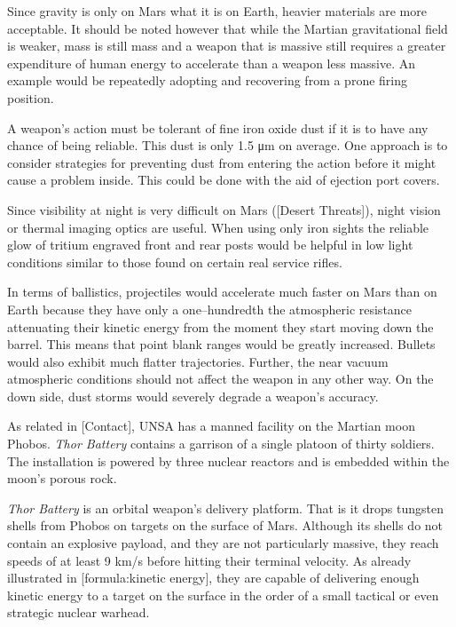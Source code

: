 Since gravity is only  on Mars what it is on Earth, heavier materials are more acceptable. It should be noted however that while the Martian gravitational field is weaker, mass is still mass and a weapon that is massive still requires a greater expenditure of human energy to accelerate than a weapon less massive. An example would be repeatedly adopting and recovering from a prone firing position.

A weapon's action must be tolerant of fine iron oxide dust if it is to have any chance of being reliable. This dust is only 1.5 μm on average. One approach is to consider strategies for preventing dust from entering the action before it might cause a problem inside. This could be done with the aid of ejection port covers.

Since visibility at night is very difficult on Mars ([Desert Threats]), night vision or thermal imaging optics are useful. When using only iron sights the reliable glow of tritium engraved front and rear posts would be helpful in low light conditions similar to those found on certain real service rifles.

In terms of ballistics, projectiles would accelerate much faster on Mars than on Earth because they have only a one--hundredth the atmospheric resistance attenuating their kinetic energy from the moment they start moving down the barrel. This means that point blank ranges would be greatly increased. Bullets would also exhibit much flatter trajectories. Further, the near vacuum atmospheric conditions should not affect the weapon in any other way. On the down side, dust storms would severely degrade a weapon's accuracy.


As related in [Contact], UNSA has a manned facility on the Martian moon Phobos. {\it Thor Battery} contains a garrison of a single platoon of thirty soldiers. The installation is powered by three nuclear reactors and is embedded within the moon's porous rock.

{\it Thor Battery} is an orbital weapon's delivery platform. That is it drops tungsten shells from Phobos on targets on the surface of Mars. Although its shells do not contain an explosive payload, and they are not particularly massive, they reach speeds of at least 9 km/s before hitting their terminal velocity. As already illustrated in [formula:kinetic energy], they are capable of delivering enough kinetic energy to a target on the surface in the order of a small tactical or even strategic nuclear warhead.

